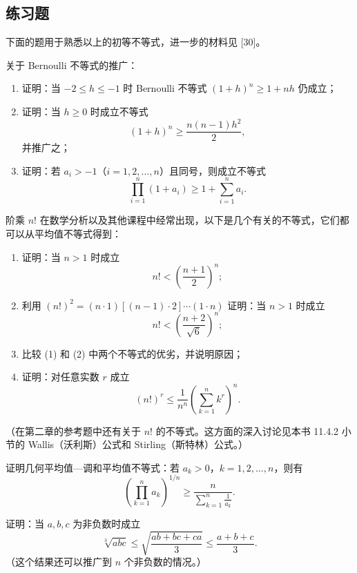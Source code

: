 \subsection{练习题}

下面的题用于熟悉以上的初等不等式，进一步的材料见 [30]。

\begin{xexercise}[1]
关于 Bernoulli 不等式的推广：
\begin{enumerate}[label=(\arabic*)]
  \item 证明：当 $-2\le h\le-1$ 时 Bernoulli 不等式 $(1+h)^n\ge1+nh$ 仍成立；
  \item 证明：当 $h\ge0$ 时成立不等式
  \[
    (1+h)^n\ge \frac{n(n-1)h^2}{2},
  \]
  并推广之；
  \item 证明：若 $a_i>-1$（$i=1,2,\ldots,n$）且同号，则成立不等式
  \[
    \prod_{i=1}^n(1+a_i)\ge1+\sum_{i=1}^n a_i.
  \]
\end{enumerate}
\end{xexercise}

\begin{xexercise}[2]
阶乘 $n!$ 在数学分析以及其他课程中经常出现，以下是几个有关的不等式，它们都可以从平均值不等式得到：
\begin{enumerate}[label=(\arabic*)]
  \item 证明：当 $n>1$ 时成立
  \[
    n!<\left(\frac{n+1}{2}\right)^n;
  \]
  \item 利用 $(n!)^2=(n\cdot1)[(n-1)\cdot2]\cdots(1\cdot n)$ 证明：当 $n>1$ 时成立
  \[
    n!<\left(\frac{n+2}{\sqrt6}\right)^n;
  \]
  \item 比较 (1) 和 (2) 中两个不等式的优劣，并说明原因；
  \item 证明：对任意实数 $r$ 成立
  \[
    (n!)^r\le \frac1{n^n}\left(\sum_{k=1}^n k^r\right)^n.
  \]
\end{enumerate}

（在第二章的参考题中还有关于 $n!$ 的不等式。这方面的深入讨论见本书 11.4.2 小节的 Wallis（沃利斯）公式和 Stirling（斯特林）公式。）
\end{xexercise}

\begin{xexercise}[3]
证明几何平均值—调和平均值不等式：若 $a_k>0$，$k=1,2,\ldots,n$，则有
\[
  \left(\prod_{k=1}^n a_k\right)^{1/n}
  \ge
  \frac{n}{\displaystyle\sum_{k=1}^n\frac1{a_k}}.
\]
\end{xexercise}

\begin{xexercise}[4]
证明：当 $a,b,c$ 为非负数时成立
\[
  \sqrt[3]{abc}\le \sqrt{\frac{ab+bc+ca}{3}}\le \frac{a+b+c}{3}.
\]
（这个结果还可以推广到 $n$ 个非负数的情况。）
\end{xexercise}

